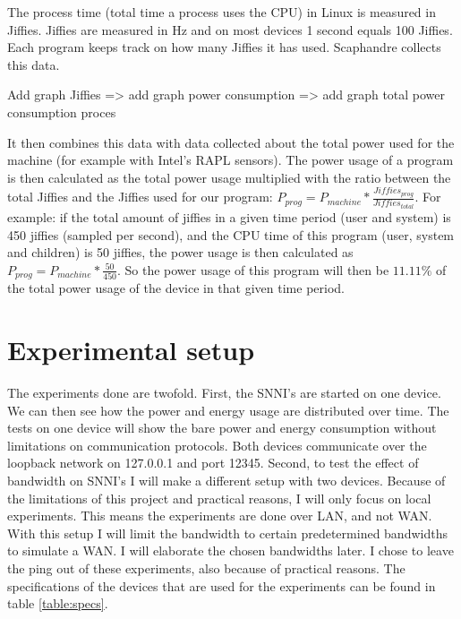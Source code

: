 \documentclass[../thesis.tex]{subfiles}
\begin{document}

The process time (total time a process uses the CPU) in Linux is measured in Jiffies. Jiffies are measured in Hz and on most devices 1 second equals 100 Jiffies. Each program keeps track on how many Jiffies it has used. Scaphandre collects this data.

\color{red} Add graph Jiffies => add graph power consumption => add graph total power consumption proces\color{black}

It then combines this data with data collected about the total power used for the machine (for example with Intel's RAPL sensors). The power usage of a program is then calculated as the total power usage multiplied with the ratio between the total Jiffies and the Jiffies used for our program: $ P_{prog} = P_{machine} * \frac{Jiffies_{prog}}{Jiffies_{total}}$. For example: if the total amount of jiffies in a given time period (user and system) is 450 jiffies (sampled per second), and the CPU time of this program (user, system and children) is 50 jiffies, the power usage is then calculated as $P_{prog} = P_{machine} * \frac{50}{450}$. So the power usage of this program will then be $11.11\%$ of the total power usage of the device in that given time period.




\section{Experimental setup}
The experiments done are twofold. First, the SNNI's are started on one device. We can then see how the power and energy usage are distributed over time. The tests on one device will show the bare power and energy consumption without limitations on communication protocols. Both devices communicate over the loopback network on 127.0.0.1 and port 12345. Second, to test the effect of bandwidth on SNNI's I will make a different setup with two devices. Because of the limitations of this project and practical reasons, I will only focus on local experiments. This means the experiments are done over LAN, and not WAN. With this setup I will limit the bandwidth to certain predetermined bandwidths to simulate a WAN. I will elaborate the chosen bandwidths later. I chose to leave the ping out of these experiments, also because of practical reasons. The specifications of the devices that are used for the experiments can be found in table \ref{table:specs}.
\end{document}
